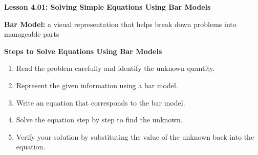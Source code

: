 \begin{center}
\textbf{Lesson 4.01: Solving Simple Equations Using Bar Models}
\end{center}

\vspace*{-1.5ex}

\textbf{Bar Model:} a visual representation that helps break down problems into manageable parts

\textbf{Steps to Solve Equations Using Bar Models}
\begin{enumerate}
    \item Read the problem carefully and identify the unknown quantity.
    \item Represent the given information using a bar model.
    \item Write an equation that corresponds to the bar model.
    \item Solve the equation step by step to find the unknown.
    \item Verify your solution by substituting the value of the unknown back into the equation.
\end{enumerate}
